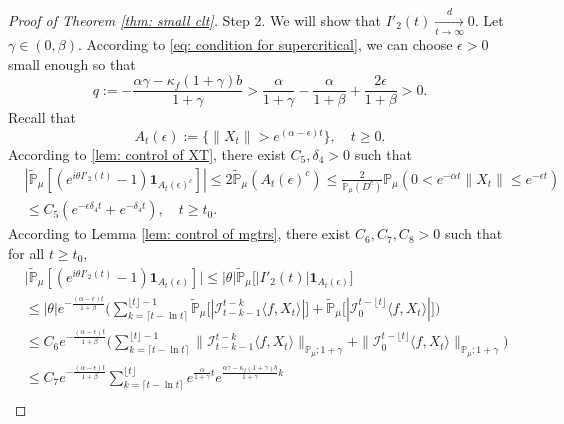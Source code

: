 \documentclass[12pt,a4paper]{amsart}
\theoremstyle{plain}
\theoremstyle{definition}
\numberwithin{equation}{section}
\begin{document}
\begin{proof}[Proof of Theorem \ref{thm: small clt}]
	Step 2.
	We will show that $I'_2(t)\xrightarrow[t\to \infty]{d} 0$.
	Let $\gamma \in (0,\beta)$.
	According to \eqref{eq: condition for supercritical}, we can choose $\epsilon > 0$ small enough so that
\[
	q:= - \frac{\alpha \gamma-\kappa_f(1+\gamma)b}{1+\gamma}
	> \frac{\alpha}{1+\gamma}-\frac{\alpha}{1+\beta} + \frac{2\epsilon}{1+\beta} > 0.
\]
	Recall that
\[
	A_t(\epsilon)
    :=\{\|X_t\|>e^{(\alpha-\epsilon )t}\},
	\quad t\geq 0.
\]
	According to \eqref{lem: control of XT}, there exist
$C_5,\delta_4>0$ such that
\begin{align}
    &|\mathbb{\tilde{P}}_{\mu}[(e^{i\theta I'_2(t)}-1)\mathbf{1}_{A_t(\epsilon)^c}]|
    \leq 2\mathbb{\tilde{P}}_{\mu}(A_t(\epsilon)^c)\leq \frac{2}{\mathbb{P}_{\mu}(D^c)}\mathbb{P}_{\mu}(0<e^{-\alpha t}\|X_t\|\leq e^{-\epsilon t})
    \\&\leq C_5(e^{-\epsilon\delta_4 t}+e^{-\delta_4 t}),
    \quad t\geq t_0.
\end{align}
	According to Lemma \ref{lem: control of mgtrs}, there exist $C_6,C_7,C_8>0$ such that for all
	$t\ge t_0$,
\begin{align}
    &\big|\mathbb{\tilde{P}}_{\mu} [ (e^{i\theta I'_2(t)}-1)\mathbf{1}_{A_t(\epsilon)}]\big|
    \leq |\theta| \mathbb{\tilde{P}}_{\mu} \big[ |I'_2(t)|\mathbf{1}_{A_t(\epsilon)}\big]
    \\&\leq|\theta| e^{-\frac{(\alpha - \epsilon )t}{1+\beta}} \Big(\sum_{k=\lceil t-\ln t \rceil}^{\lfloor t \rfloor - 1}\mathbb{\tilde{P}}_{\mu}\big[| \mathcal{I}_{t-k-1}^{t-k}\langle f,X_t\rangle|\big] + \mathbb{\tilde{P}}_{\mu}\big[| \mathcal{I}_{0}^{t-\lfloor t\rfloor}\langle f,X_t\rangle|\big]\Big)
    \\& \leq C_6  e^{-\frac{(\alpha - \epsilon )t}{1+\beta}} \Big(\sum_{k=\lceil t-\ln t \rceil}^{\lfloor t \rfloor - 1}\|\mathcal{I}_{t-k-1}^{t-k}\langle f,X_t\rangle\|_{\mathbb P_\mu; 1+\gamma} + \|\mathcal I_0^{t-\lfloor t \rfloor} \langle f, X_t\rangle\|_{\mathbb P_\mu;1+\gamma}\Big)
    \\ &\leq C_7  e^{-\frac{(\alpha - \epsilon )t}{1+\beta}} \sum_{k=\lceil t-\ln t \rceil}^{\lfloor t \rfloor}e^{\frac{\alpha}{1+\gamma}t}e^{\frac{\alpha\gamma-\kappa_f(1+\gamma)b}{1+\gamma}k}\\

\end{align}
\end{proof}
\end{document}
